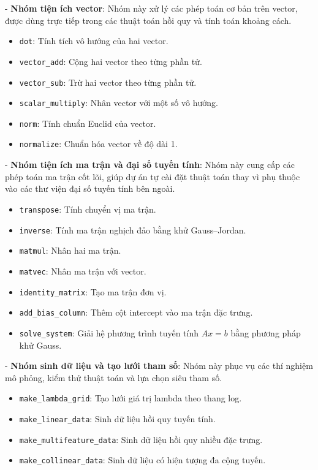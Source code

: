 \documentclass[12pt,a4paper]{report}
\begin{document}
- \textbf{Nhóm tiện ích vector}:
Nhóm này xử lý các phép toán cơ bản trên vector, được dùng trực tiếp trong các thuật toán hồi quy và tính toán khoảng cách.
\begin{itemize}
    \item \texttt{dot}: Tính tích vô hướng của hai vector.
    \item \texttt{vector\_add}: Cộng hai vector theo từng phần tử.
    \item \texttt{vector\_sub}: Trừ hai vector theo từng phần tử.
    \item \texttt{scalar\_multiply}: Nhân vector với một số vô hướng.
    \item \texttt{norm}: Tính chuẩn Euclid của vector.
    \item \texttt{normalize}: Chuẩn hóa vector về độ dài 1.
\end{itemize}

- \textbf{Nhóm tiện ích ma trận và đại số tuyến tính}:
Nhóm này cung cấp các phép toán ma trận cốt lõi, giúp dự án tự cài đặt thuật toán thay vì phụ thuộc vào các thư viện đại số tuyến tính bên ngoài.
\begin{itemize}
    \item \texttt{transpose}: Tính chuyển vị ma trận.
    \item \texttt{inverse}: Tính ma trận nghịch đảo bằng khử Gauss--Jordan.
    \item \texttt{matmul}: Nhân hai ma trận.
    \item \texttt{matvec}: Nhân ma trận với vector.
    \item \texttt{identity\_matrix}: Tạo ma trận đơn vị.
    \item \texttt{add\_bias\_column}: Thêm cột intercept vào ma trận đặc trưng.
    \item \texttt{solve\_system}: Giải hệ phương trình tuyến tính $Ax=b$ bằng phương pháp khử Gauss.
\end{itemize}

- \textbf{Nhóm sinh dữ liệu và tạo lưới tham số}:
Nhóm này phục vụ các thí nghiệm mô phỏng, kiểm thử thuật toán và lựa chọn siêu tham số.
\begin{itemize}
    \item \texttt{make\_lambda\_grid}: Tạo lưới giá trị lambda theo thang log.
    \item \texttt{make\_linear\_data}: Sinh dữ liệu hồi quy tuyến tính.
    \item \texttt{make\_multifeature\_data}: Sinh dữ liệu hồi quy nhiều đặc trưng.
    \item \texttt{make\_collinear\_data}: Sinh dữ liệu có hiện tượng đa cộng tuyến.
\end{itemize}
\end{document}
